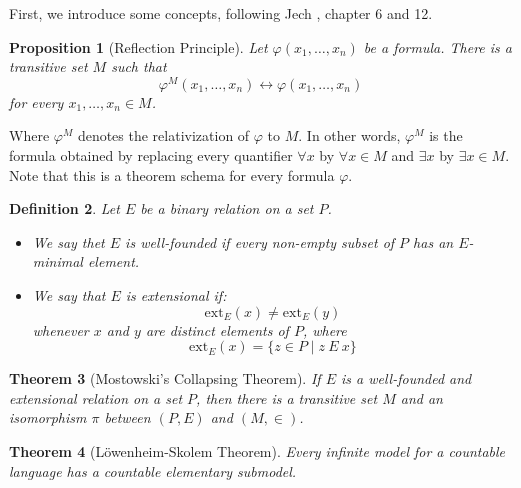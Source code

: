 \documentclass{report}
\newtheorem{thm}{Theorem}[section]
\newtheorem{dfn}[thm]{Definition}
\newtheorem{prop}[thm]{Proposition}
\begin{document}
First, we introduce some concepts,
following Jech \cite{jech_set_theory}, chapter 6 and 12.

\begin{prop}[Reflection Principle]
Let $\varphi(x_1, \ldots, x_n)$ be a formula. There is a transitive set $M$ such that 
$$\varphi^M(x_1, \ldots, x_n) \leftrightarrow \varphi(x_1, \ldots, x_n)$$
for every $x_1, \ldots, x_n \in M$.
\end{prop}
Where $\varphi^M$ denotes the relativization of $\varphi$ to $M$.
In other words, $\varphi^M$ is the formula obtained 
by replacing every quantifier $\forall x$ by $\forall x \in M$ and $\exists x$ by $\exists x \in M$.
Note that this is a theorem schema for every formula $\varphi$.

\begin{dfn}
  Let $E$ be a binary relation on a set $P$.
  \begin{itemize}
    \item 
  We say thet $E$ is \emph{well-founded} if every non-empty subset of $P$ has an $E$-minimal element.
  \item
  We say that $E$ is extensional if:
  $$\mathrm{ext}_E(x) \ne \mathrm{ext}_E(y)$$
  whenever $x$ and $y$ are distinct elements of $P$, 
  where 
  $$\mathrm{ext}_E(x) = \{ z \in P \mid z\ E\ x \}$$ 
\end{itemize}
\end{dfn}

\begin{thm}[Mostowski's Collapsing Theorem]
  If $E$ is a well-founded and extensional relation on a set $P$, 
  then there is a transitive set $M$ and an isomorphism $\pi$ between $(P, E)$ and $(M, \in)$.
\end{thm}

\begin{thm}[L\"owenheim-Skolem Theorem]\label{thm:lowenheim_skolem}
  Every infinite model for a countable language has a countable elementary submodel.
\end{thm}
\end{document}
